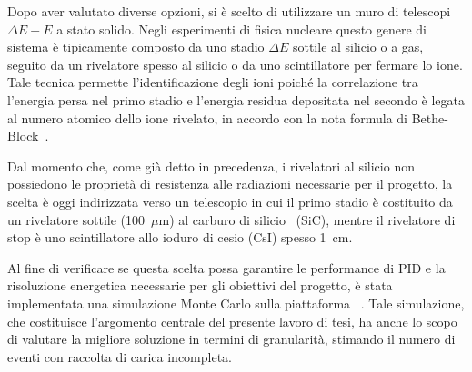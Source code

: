 Dopo aver valutato diverse opzioni, si è scelto di utilizzare un muro di telescopi $ \Delta E - E $ a stato solido.
Negli esperimenti di fisica nucleare questo genere di sistema è tipicamente composto da uno stadio $\Delta E$ sottile al silicio o a gas, seguito da un rivelatore spesso al silicio o da uno scintillatore per fermare lo ione.
Tale tecnica permette l'identificazione degli ioni poiché la correlazione tra l'energia persa nel primo stadio e l'energia residua depositata nel secondo è legata al numero atomico dello ione rivelato, in accordo con la nota formula di Bethe-Block~\cite{knoll:10}.

Dal momento che, come già detto in precedenza, i rivelatori al silicio non possiedono le proprietà di resistenza alle radiazioni necessarie per il progetto, la scelta è oggi indirizzata verso un telescopio in cui il primo stadio è costituito da un rivelatore sottile (100~$\mu $m) al carburo di silicio~\cite{tudisco:sensors18} (SiC), mentre il rivelatore di stop è uno scintillatore allo ioduro di cesio (CsI) spesso 1~cm.

Al fine di verificare se questa scelta possa garantire le performance di PID e la risoluzione energetica necessarie per gli obiettivi del progetto, è stata implementata una simulazione Monte Carlo sulla piattaforma \geant~\cite{agostinelli:nima02,allison:nima16,allison:ieeetns06}.
Tale simulazione, che costituisce l'argomento centrale del presente lavoro di tesi, ha anche lo scopo di valutare la migliore soluzione in termini di granularità, stimando il numero di eventi con raccolta di carica incompleta.








\section{}

